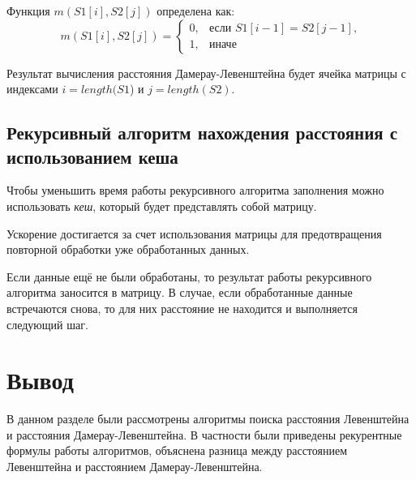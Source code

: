 Функция $m(S1[i], S2[j])$ определена как:
\begin{equation}
\label{eq:m2}
m(S1[i], S2[j]) = \begin{cases}
0, &\text{если $S1[i - 1] = S2[j - 1]$,}\\
1, &\text{иначе}
\end{cases}
\end{equation}

Результат вычисления расстояния Дамерау-Левенштейна будет ячейка матрицы с индексами $i = length(S1$) и $j = length(S2)$.


\subsection{Рекурсивный алгоритм нахождения расстояния с использованием кеша}

Чтобы уменьшить время работы рекурсивного алгоритма заполнения можно использовать \textit{кеш}, который будет представлять собой матрицу.

Ускорение достигается за счет использования матрицы для предотвращения повторной обработки уже обработанных данных.

Если данные ещё не были обработаны, то результат работы рекурсивного алгоритма заносится в матрицу. 
В случае, если обработанные данные встречаются снова, то для них расстояние не находится и выполняется следующий шаг.


\section{Вывод}
В данном разделе были рассмотрены алгоритмы поиска расстояния Левенштейна и расстояния Дамерау-Левенштейна. В частности были приведены рекурентные формулы работы алгоритмов, объяснена разница между расстоянием Левенштейна и расстоянием Дамерау-Левенштейна.
